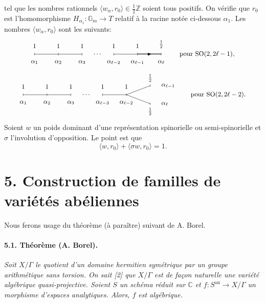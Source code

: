 \documentclass[10pt,leqno]{article}
\newcommand{\C}{\mathbb{C}}
\newcommand{\Z}{\mathbb{Z}}
\newcommand{\Gm}{\mathbb{G}_m}
\newcommand{\SO}{\operatorname{SO}}
\begin{document}
tel que les nombres rationnels $\langle w_\alpha,r_0\rangle\in\frac12\Z$ soient tous positifs. On vérifie que $r_0$ est l'homomorphisme $H_{\alpha_1}:\Gm\to T$ relatif à la racine notée ci-dessous $\alpha_1$. Les nombres $\langle w_\alpha,r_0\rangle$ sont les suivants:
\[
\begin{tikzpicture}[x=0.78cm,y=0.72cm,baseline=(current bounding box.center),font=\small]
\draw (0,0)--(3,0);
\node at (4,0) {$\cdots$};
\draw (5,0)--(6.5,0);
\draw[double distance=1.0pt] (6.5,0)--(8,0); \fill (7.35,0)--(7.16,0.10)--(7.16,-0.10)--cycle;
\foreach \x/\a/\v in {0/{\alpha_1}/1,1.5/{\alpha_2}/1,3/{\alpha_3}/1,5/{\alpha_{\ell-2}}/1,6.5/{\alpha_{\ell-1}}/1,8/{\alpha_\ell}/{\frac12}}{
  \draw (\x,-0.08)--(\x,0.08);
  \node[above=5pt] at (\x,0) {$\v$};
  \node[below=5pt] at (\x,0) {$\a$};
}
\node[anchor=west] at (9,0) {pour $\SO(2,2\ell-1)$,};
\end{tikzpicture}
\]
\[
\begin{tikzpicture}[x=0.78cm,y=0.72cm,baseline=(current bounding box.center),font=\small]
\draw (0,0)--(3,0);
\node at (4,0) {$\cdots$};
\draw (5,0)--(6.5,0);
\draw (6.5,0)--(8,0.62);
\draw (6.5,0)--(8,-0.62);
\foreach \x/\a in {0/{\alpha_1},1.5/{\alpha_2},3/{\alpha_3},5/{\alpha_{\ell-3}},6.5/{\alpha_{\ell-2}}}{
  \draw (\x,-0.08)--(\x,0.08);
  \node[above=5pt] at (\x,0) {$1$};
  \node[below=5pt] at (\x,0) {$\a$};
}
\draw (8,0.54)--(8,0.70);
\draw (8,-0.70)--(8,-0.54);
\node[above=2pt] at (8,0.62) {$\frac12$};
\node[below=2pt] at (8,-0.62) {$\frac12$};
\node[anchor=west] at (8.55,0.62) {$\alpha_{\ell-1}$};
\node[anchor=west] at (8.55,-0.62) {$\alpha_\ell$};
\node[anchor=west] at (10.4,0) {pour $\SO(2,2\ell-2)$.};
\end{tikzpicture}
\]
Soient $w$ un poids dominant d'une représentation spinorielle ou semi-spinorielle et $\sigma$ l'involution d'opposition. Le point est que
\[
\langle w,r_0\rangle+\langle\sigma w,r_0\rangle=1.
\]

\section*{5. Construction de familles de variétés abéliennes}

Nous ferons usage du théorème (à paraître) suivant de A. Borel.

\paragraph{5.1. Théorème (A. Borel).} \emph{Soit $X/\Gamma$ le quotient d'un domaine hermitien symétrique par un groupe arithmétique sans torsion. On sait [2] que $X/\Gamma$ est de façon naturelle une variété algébrique quasi-projective. Soient $S$ un schéma réduit sur $\C$ et $f:S^{\mathrm{an}}\to X/\Gamma$ un morphisme d'espaces analytiques. Alors, $f$ est algébrique.}
\end{document}
